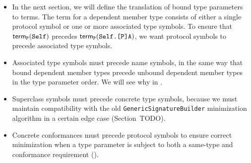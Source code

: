 \documentclass[../generics]{subfiles}
\begin{document}
\begin{itemize}
\item In the next section, we will define the translation of bound type parameters to terms. The term for a dependent member type consists of either a single protocol symbol or one or more associated type symbols. To ensure that $\mathsf{term}_{\texttt{P}}(\texttt{Self})$ precedes $\mathsf{term}_{\texttt{P}}(\texttt{Self.[P]A})$, we want protocol symbols to precede associated type symbols.
\item Associated type symbols must precede name symbols, in the same way that bound dependent member types precede unbound dependent member types in the type parameter order. We will see why in .
\item Superclass symbols must precede concrete type symbols, because we must maintain compatibility with the old \texttt{GenericSignatureBuilder} minimization algorithm in a certain edge case (Section~TODO).
\item Concrete conformances must precede protocol symbols to ensure correct minimization when a type parameter is subject to both a same-type and conformance requirement ().
\end{itemize}
\end{document}
